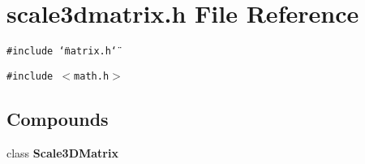 \section{scale3dmatrix.h File Reference}
\label{scale3dmatrix_8h}
{\tt \#include \char`\"{}matrix.h\char`\"{}}\par
{\tt \#include $<$math.h$>$}\par
\subsection*{Compounds}
\begin{CompactItemize}
\item 
class {\bf Scale3DMatrix}
\end{CompactItemize}

